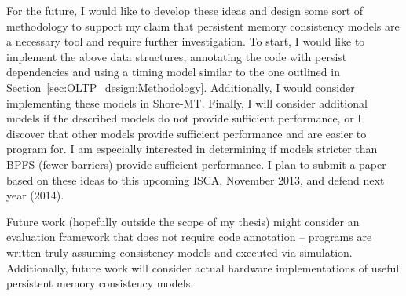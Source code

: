 For the future, I would like to develop these ideas and design some sort of methodology to support my claim that persistent memory consistency models are a necessary tool and require further investigation.
To start, I would like to implement the above data structures, annotating the code with persist dependencies and using a timing model similar to the one outlined in Section~\ref{sec:OLTP_design:Methodology}.
Additionally, I would consider implementing these models in Shore-MT.
Finally, I will consider additional models if the described models do not provide sufficient performance, or I discover that other models provide sufficient performance and are easier to program for.
I am especially interested in determining if models stricter than BPFS (fewer barriers) provide sufficient performance.
I plan to submit a paper based on these ideas to this upcoming ISCA, November 2013, and defend next year (2014).

Future work (hopefully outside the scope of my thesis) might consider an evaluation framework that does not require code annotation -- programs are written truly assuming consistency models and executed via simulation.
Additionally, future work will consider actual hardware implementations of useful persistent memory consistency models.
